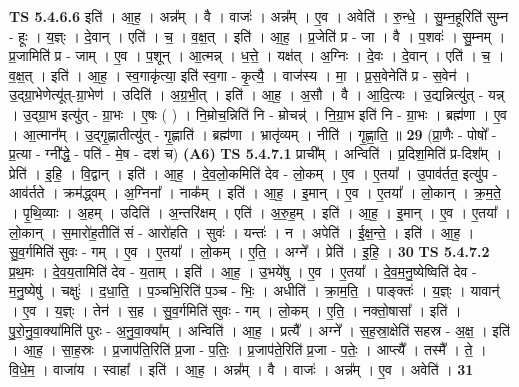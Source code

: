 \documentclass[17pt]{extarticle}
\begin{document}
                  \newline
                                \textbf{ TS 5.4.6.6} \newline
                  इति॑ । आ॒ह॒ । अन्न᳚म् । वै । वाजः॑ । अन्न᳚म् । ए॒व । अवेति॑ । रु॒न्धे॒ । सु॒म्न॒हूरिति॑ सुम्न - हूः । य॒ज्ञ्ः । दे॒वान् । एति॑ । च॒ । व॒क्ष॒त् । इति॑ । आ॒ह॒ । प्र॒जेति॑ प्र - जा । वै । प॒शवः॑ । सु॒म्नम् । प्र॒जामिति॑ प्र - जाम् । ए॒व । प॒शून् । आ॒त्मन्न् । ध॒त्ते॒ । यक्ष॑त् । अ॒ग्निः । दे॒वः । दे॒वान् । एति॑ । च॒ । व॒क्ष॒त् । इति॑ । आ॒ह॒ । स्व॒गाकृ॑त्या॒ इति॑ स्व॒गा - कृ॒त्यै॒ । वाज॑स्य । मा॒ । प्र॒स॒वेनेति॑ प्र - स॒वेन॑ । उ॒द्ग्रा॒भेणेत्यू॑त्-ग्रा॒भेण॑ । उदिति॑ । अ॒ग्र॒भी॒त् । इति॑ । आ॒ह॒ । अ॒सौ । वै । आ॒दि॒त्यः । उ॒द्यन्नित्यु॑त् - यन्न् । उ॒द्ग्रा॒भ इत्यु॑त् - ग्रा॒भः । ए॒षः ( ) । नि॒म्रोच॒न्निति॑ नि - म्रोचन्न्॑ । नि॒ग्रा॒भ इति॑ नि - ग्रा॒भः । ब्रह्म॑णा । ए॒व । आ॒त्मान᳚म् । उ॒द्गृ॒ह्णातीत्यु॑त् - गृ॒ह्णाति॑ । ब्रह्म॑णा । भ्रातृ॑व्यम् । नीति॑ । गृ॒ह्णा॒ति॒ ॥ \textbf{  29 } \newline
                  \newline
                      (प्रा॒णैः - पोषो᳚ - प्र॒त्या - ग्नी᳚द्धे॒ - पति॑ - मे॒ष - दश॑ च)  \textbf{(A6)} \newline \newline
                                \textbf{ TS 5.4.7.1} \newline
                  प्राची᳚म् । अन्विति॑ । प्र॒दिश॒मिति॑ प्र-दिश᳚म् । प्रेति॑ । इ॒हि॒ । वि॒द्वान् । इति॑ । आ॒ह॒ । दे॒व॒लो॒कमिति॑ देव - लो॒कम् । ए॒व । ए॒तया᳚ । उ॒पाव॑र्तत॒ इत्यु॑प - आव॑र्तते । क्रम॑द्ध्वम् । अ॒ग्निना᳚ । नाक᳚म् । इति॑ । आ॒ह॒ । इ॒मान् । ए॒व । ए॒तया᳚ । लो॒कान् । क्र॒म॒ते॒ । पृ॒थि॒व्याः । अ॒हम् । उदिति॑ । अ॒न्तरि॑क्षम् । एति॑ । अ॒रु॒ह॒म् । इति॑ । आ॒ह॒ । इ॒मान् । ए॒व । ए॒तया᳚ । लो॒कान् । स॒मारो॑ह॒तीति॑ सं - आरो॑हति । सुवः॑ । यन्तः॑ । न । अपेति॑ । ई॒क्ष॒न्ते॒ । इति॑ । आ॒ह॒ । सु॒व॒र्गमिति॑ सुवः - गम् । ए॒व । ए॒तया᳚ । लो॒कम् । ए॒ति॒ । अग्ने᳚ । प्रेति॑ । इ॒हि॒ । \textbf{  30} \newline
                  \newline
                                \textbf{ TS 5.4.7.2} \newline
                  प्र॒थ॒मः । दे॒व॒य॒तामिति॑ देव - य॒ताम् । इति॑ । आ॒ह॒ । उ॒भये॑षु । ए॒व । ए॒तया᳚ । दे॒व॒म॒नु॒ष्येष्विति॑ देव - म॒नु॒ष्येषु॑ । चक्षुः॑ । द॒धा॒ति॒ । प॒ञ्चभि॒रिति॑ प॒ञ्च - भिः॒ । अधीति॑ । क्रा॒म॒ति॒ । पाङ्क्तः॑ । य॒ज्ञ्ः । यावान्॑ । ए॒व । य॒ज्ञ्ः । तेन॑ । स॒ह । सु॒व॒र्गमिति॑ सुवः - गम् । लो॒कम् । ए॒ति॒ । नक्तो॒षासा᳚ । इति॑ । पु॒रो॒नु॒वा॒क्या॑मिति॑ पुरः - अ॒नु॒वा॒क्या᳚म् । अन्विति॑ । आ॒ह॒ । प्रत्यै᳚ । अग्ने᳚ । स॒ह॒स्रा॒क्षेति॑ सहस्र - अ॒क्ष॒ । इति॑ । आ॒ह॒ । सा॒ह॒स्रः । प्र॒जाप॑ति॒रिति॑ प्र॒जा - प॒तिः॒ । प्र॒जाप॑ते॒रिति॑ प्र॒जा - प॒तेः॒ । आप्त्यै᳚ । तस्मै᳚ । ते॒ । वि॒धे॒म॒ । वाजा॑य । स्वाहा᳚ । इति॑ । आ॒ह॒ । अन्न᳚म् । वै । वाजः॑ । अन्न᳚म् । ए॒व । अवेति॑ । \textbf{  31} \newline
\end{document}
